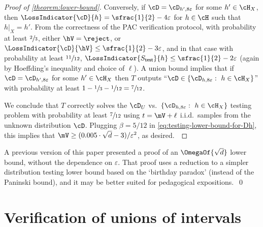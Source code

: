 \documentclass{toc}
\begin{document}
\begin{proof}[Proof of \cref{theorem:lower-bound}]
	Conversely, if $\cD = \cD_{h',8\varepsilon}$ for some $h' \in \cH_X$,
	then $\LossIndicator{\cD}{h} = \sfrac{1}{2}-4\varepsilon$ for $h \in \cH$ such that $h|_X = h'$. From the correctness of the PAC verification protocol, with probability at least $\sfrac{2}{3}$, either $\hV = \reject$, or $\LossIndicator{\cD}{\hV} \leq \sfrac{1}{2}-3\varepsilon$, and in that case with probability at least $\sfrac{11}{12}$, $\LossIndicator{S_{\mathsf{test}}}{h} \leq \sfrac{1}{2}-2\varepsilon$  (again by Hoeffding's inequality and choice of $\ell$). A union bound implies that if $\cD = \cD_{h',8\varepsilon}$ for some $h' \in \cH_X$ then $T$ outputs ``$\cD \in \{\cD_{h,8\varepsilon} : ~ h \in \cH_X\}$'' with probability at least $1 - \sfrac{1}{3} - \sfrac{1}{12} = \sfrac{7}{12}$.

	We conclude that $T$ correctly solves the $\cD_U$ vs.\ $\{\cD_{h,8\varepsilon}: ~ h \in \cH_X\}$ testing problem with probability at least $\sfrac{7}{12}$ using $t = \mV + \ell$ i.i.d.\ samples from the unknown distribution $\cD$. Plugging $\beta=5/12$ in \cref{eq:testing-lower-bound-for-Dh}, this implies that $\mV \geq (0.005 \cdot \sqrt{d}-3)/\varepsilon^2$, as desired.~\qedhere
\end{proof}

\begin{remark}
	A previous version of this paper \cite{older-arxiv-version} presented a proof of an $\OmegaOf{\sqrt{d}}$ lower bound, without the dependence on $\varepsilon$. That proof uses a reduction to a simpler distribution testing lower bound based on the `birthday paradox' (instead of the Paninski bound), and it may be better suited for pedagogical expositions.~\qed
\end{remark}

\section{Verification of unions of intervals}
\label{section:verification-union-of-intervals}

\end{document}
